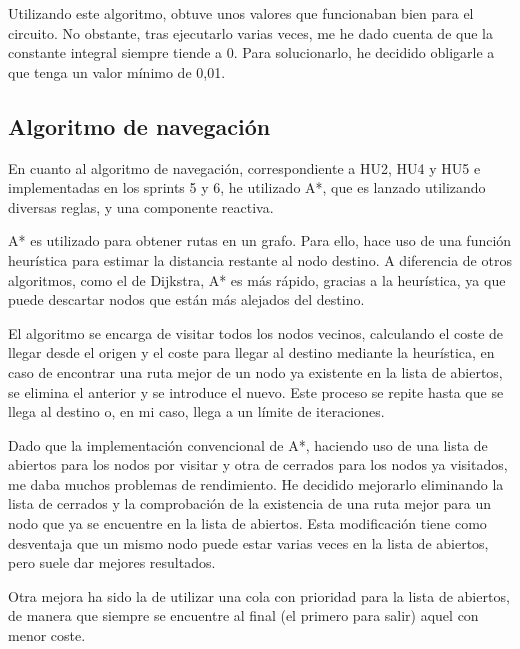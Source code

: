 \bigskip

Utilizando este algoritmo, obtuve unos valores que funcionaban bien para el circuito. No obstante, tras ejecutarlo varias veces, me he dado cuenta de que la constante integral siempre tiende a 0. Para solucionarlo, he decidido obligarle a que tenga un valor mínimo de 0,01.

\subsection{Algoritmo de navegación}

En cuanto al algoritmo de navegación, correspondiente a HU2, HU4 y HU5 e implementadas en los sprints 5 y 6, he utilizado A*\cite{4082128}, que es lanzado utilizando diversas reglas, y una componente reactiva. 

\bigskip

A* es utilizado para obtener rutas en un grafo. Para ello, hace uso de una función heurística para estimar la distancia restante al nodo destino. A diferencia de otros algoritmos, como el de Dijkstra, A* es más rápido, gracias a la heurística, ya que puede descartar nodos que están más alejados del destino.

\bigskip

El algoritmo se encarga de visitar todos los nodos vecinos, calculando el coste de llegar desde el origen y el coste para llegar al destino mediante la heurística, en caso de encontrar una ruta mejor de un nodo ya existente en la lista de abiertos, se elimina el anterior y se introduce el nuevo. Este proceso se repite hasta que se llega al destino o, en mi caso, llega a un límite de iteraciones.

\bigskip

Dado que la implementación convencional de A*, haciendo uso de una lista de abiertos para los nodos por visitar y otra de cerrados para los nodos ya visitados, me daba muchos problemas de rendimiento. He decidido mejorarlo eliminando la lista de cerrados y la comprobación de la existencia de una ruta mejor para un nodo que ya se encuentre en la lista de abiertos\cite{a-star}. Esta modificación tiene como desventaja que un mismo nodo puede estar varias veces en la lista de abiertos, pero suele dar mejores resultados\cite{Chen2007PriorityQA}.

\bigskip

Otra mejora ha sido la de utilizar una cola con prioridad para la lista de abiertos, de manera que siempre se encuentre al final (el primero para salir) aquel con menor coste.

